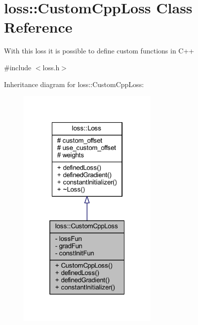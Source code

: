 \hypertarget{classloss_1_1_custom_cpp_loss}{}\section{loss\+:\+:Custom\+Cpp\+Loss Class Reference}
\label{classloss_1_1_custom_cpp_loss}


With this loss it is possible to define custom functions in {\ttfamily C++}  




{\ttfamily \#include $<$loss.\+h$>$}



Inheritance diagram for loss\+:\+:Custom\+Cpp\+Loss\+:\nopagebreak
\begin{figure}[H]
\begin{center}
\leavevmode
\includegraphics[width=193pt]{classloss_1_1_custom_cpp_loss__inherit__graph}
\end{center}
\end{figure}



